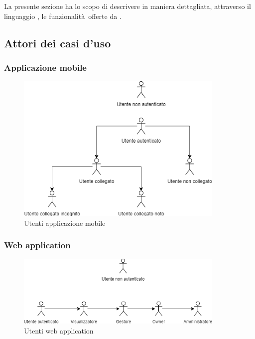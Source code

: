 \documentclass[../analisi-dei-requisiti.tex]{subfiles}
\begin{document}
La presente sezione ha lo scopo di descrivere in maniera dettagliata, attraverso il linguaggio , le funzionalità offerte da .

\subsection{Attori dei casi d'uso}%
\label{sub:attori_casi_duso}

\subsubsection{Applicazione mobile}%
\label{subs:mobile_app}

\begin{figure}[H]
  \centering
  \includegraphics[width=100mm]{diagrams/users-diagrams/app_users.png}
  \caption{Utenti applicazione mobile}%
  \label{fig:usersapp}
\end{figure}

\subsubsection{Web application}%
\label{subs:web_application}

\begin{figure}[H]
  \centering
  \includegraphics[width=100mm]{diagrams/users-diagrams/web_users.png}
  \caption{Utenti web application}%
  \label{fig:usersweb}
\end{figure}
\end{document}
